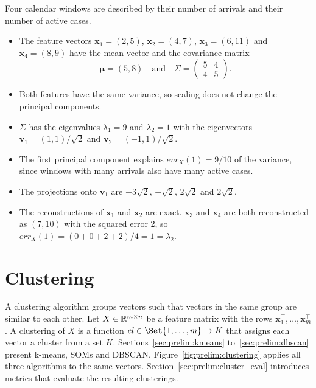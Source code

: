 \begin{example}
	\label{ex:prelim:pca}
	Four calendar windows are described by their number of arrivals and their number of active cases.
	\begin{itemize}
		\item The feature vectors $\mathbf{x}_1 = (2, 5)$, $\mathbf{x}_2 = (4, 7)$, $\mathbf{x}_3 = (6, 11)$ and $\mathbf{x}_4 = (8, 9)$ have the mean vector and the covariance matrix
		      \[
			      \boldsymbol{\mu} = (5, 8)
			      \quad\text{and}\quad
			      \Sigma = \begin{pmatrix} 5 & 4 \\ 4 & 5 \end{pmatrix}.
		      \]

		\item Both features have the same variance, so scaling does not change the principal components.

		\item $\Sigma$ has the eigenvalues $\lambda_1 = 9$ and $\lambda_2 = 1$ with the eigenvectors $\mathbf{v}_1 = (1, 1) / \sqrt{2}$ and $\mathbf{v}_2 = (-1, 1) / \sqrt{2}$.

		\item The first principal component explains $\mathit{evr}_X(1) = 9/10$ of the variance, since windows with many arrivals also have many active cases.

		\item The projections onto $\mathbf{v}_1$ are $-3\sqrt{2}$, $-\sqrt{2}$, $2\sqrt{2}$ and $2\sqrt{2}$.

		\item The reconstructions of $\mathbf{x}_1$ and $\mathbf{x}_2$ are exact. $\mathbf{x}_3$ and $\mathbf{x}_4$ are both reconstructed as $(7, 10)$ with the squared error 2, so $\mathit{err}_X(1) = (0 + 0 + 2 + 2) / 4 = 1 = \lambda_2$.
	\end{itemize}
\end{example}

\section{Clustering}
\label{sec:prelim:clustering}
A clustering algorithm groups vectors such that vectors in the same group are similar to each other. Let $X \in \mathbb R^{m \times n}$ be a feature matrix with the rows $\mathbf{x}_1^\top, \dots, \mathbf{x}_m^\top$. A clustering of $X$ is a function $\mathit{cl} \in \Set{1, \dots, m} \to K$ that assigns each vector a cluster from a set $K$. Sections~\ref{sec:prelim:kmeans} to~\ref{sec:prelim:dbscan} present k-means, SOMs and DBSCAN. Figure~\ref{fig:prelim:clustering} applies all three algorithms to the same vectors. Section~\ref{sec:prelim:cluster_eval} introduces metrics that evaluate the resulting clusterings.

